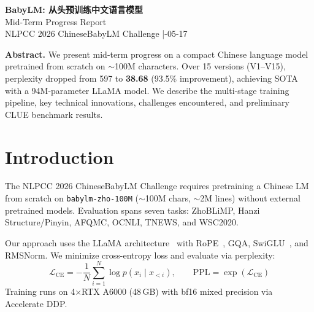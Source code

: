 \documentclass[10pt,a4paper]{ctexart}
\begin{document}
\small

\begin{center}
    {\Large\bfseries BabyLM: 从头预训练中文语言模型} \\[4pt]
    {\normalsize Mid-Term Progress Report} \\[4pt]
    {\small NLPCC 2026 ChineseBabyLM Challenge \quad|-05-17}
\end{center}

\vspace{4pt}

\noindent\textbf{Abstract.} We present mid-term progress on a compact Chinese language model pretrained from scratch on $\sim$100M characters. Over 15 versions (V1--V15), perplexity dropped from 597 to \textbf{38.68} (93.5\% improvement), achieving SOTA with a 94M-parameter LLaMA model. We describe the multi-stage training pipeline, key technical innovations, challenges encountered, and preliminary CLUE benchmark results.
\vspace{-2pt}

\section{Introduction}

The NLPCC 2026 ChineseBabyLM Challenge requires pretraining a Chinese LM from scratch on \texttt{babylm-zho-100M} ($\sim$100M chars, $\sim$2M lines) without external pretrained models. Evaluation spans seven tasks: ZhoBLiMP, Hanzi Structure/Pinyin, AFQMC, OCNLI, TNEWS, and WSC2020.

Our approach uses the LLaMA architecture~\cite{touvron2023llama} with RoPE~\cite{su2021roformer}, GQA, SwiGLU~\cite{shazeer2020glu}, and RMSNorm. We minimize cross-entropy loss and evaluate via perplexity:
\begin{equation}
    \mathcal{L}_{\text{CE}} = -\frac{1}{N}\sum_{i=1}^{N} \log p(x_i \mid x_{<i}), \qquad
    \text{PPL} = \exp(\mathcal{L}_{\text{CE}})
    \label{eq:ppl}
\end{equation}
\vspace{-2pt}
Training runs on 4$\times$RTX A6000 (48\,GB) with bf16 mixed precision via Accelerate DDP.

\end{document}
